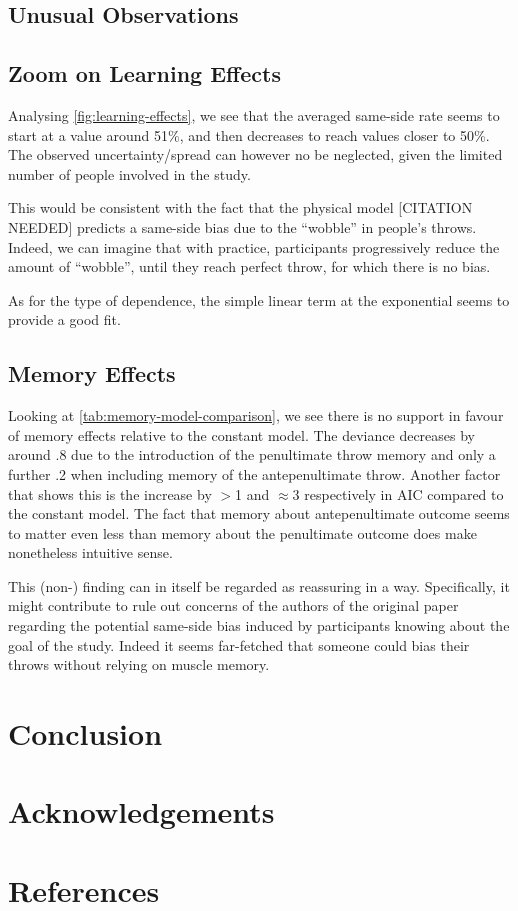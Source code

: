 \documentclass[a4paper, 12pt,oneside]{article}
\begin{document}
		\subsection{Unusual Observations}

		\subsection{Zoom on Learning Effects}\label{sec:disc-learning-effects}
			Analysing \ref{fig:learning-effects}, we see that the averaged same-side rate seems to start at a value around 51\%, and then decreases to reach values closer to 50\%. The observed uncertainty/spread can however no be neglected, given the limited number of people involved in the study. 
			
			This would be consistent with the fact that the physical model [CITATION NEEDED] predicts a same-side bias due to the ``wobble'' in people's throws. Indeed, we can imagine that with practice, participants progressively reduce the amount of ``wobble'', until they reach perfect throw, for which there is no bias. 

			As for the type of dependence, the simple linear term at the exponential seems to provide a good fit.  
		\subsection{Memory Effects}
		Looking at \ref{tab:memory-model-comparison}, we see there is no support in favour of memory effects relative to the constant model. The deviance decreases by around .8 due to the introduction of the penultimate throw memory and only a further .2 when including memory of the antepenultimate throw. Another factor that shows this is the increase by $>$1 and $\approx 3$ respectively in AIC compared to the constant model.
		The fact that memory about antepenultimate outcome seems to matter even less than memory about the penultimate outcome does make nonetheless intuitive sense. 

		This (non-) finding can in itself be regarded as reassuring in a way. Specifically, it might contribute to rule out concerns of the authors of the original paper regarding the potential same-side bias induced by participants knowing about the goal of the study. Indeed it seems far-fetched that someone could bias their throws without relying on muscle memory. 
	\section{Conclusion}
	\section*{Acknowledgements}
	\section*{References}
\end{document}
